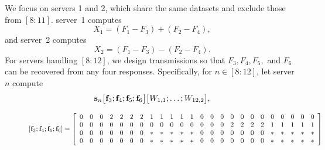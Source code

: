 \documentclass[conference,letterpaper]{IEEEtran}
\begin{document}
\begin{example}

We focus on servers 1 and 2, which share the same datasets and exclude those from $[8{:}11]$. 
server~1 computes 
\[
X_1 = (F_1 - F_3) + (F_2 - F_4),
\]
and server~2 computes
\[
X_2 = (F_1 - F_3) - (F_2 - F_4).
\]
For servers handling $[8{:}12]$, we design transmissions so that $F_3, F_4, F_5,$ and $F_6$ 
can be recovered from any four responses. Specifically, for $n \in [8{:}12]$, let 
server~$n$ compute
\[
{\bf s}_n \bigl[ {\bf f}_3 ; {\bf f}_4 ; {\bf f}_5 ; {\bf f}_6 \bigr] 
\bigl[ W_{1,1}; \ldots; W_{12,2} \bigr],
\]


\iffalse
\begin{figure}
\begin{equation} \label{eq:scheme 3 transmission of second class}
\begin{aligned}
\left[ {{\bf f}}_3 ;  {{\bf f}}_4 ;  {{\bf f}}_5 ;  {{\bf f}}_6 \right] = 
 \left[
\begin{array}{cccccccccccccccccccccccc}
 0 & 0 & 0 &  2 & 2 & 2 & 2 &  1 & 1 & 1 & 1 & 1 & 0 & 0 & 0 & 0 & 0 & 0 & 0 & 0 & 0 & 0 & 0 & 0 \\
 0 & 0 & 0 & 0 & 0 & 0 & 0 & 0 & 0 & 0 & 0 & 0 & 0 & 0 & 0 & 2 & 2 & 2 & 2 & 1 & 1 & 1 & 1 & 1 \\
 0 & 0 & 0 & 0 & 0 & 0 & 0 & * & * & * & * & * & 0 & 0 & 0 & 0 & 0 & 0 & 0 & * & * & * & * & * \\
 0 & 0 & 0 & 0 & 0 & 0 & 0 & * & * & * & * & * & 0 & 0 & 0 & 0 & 0 & 0 & 0 & * & * & * & * & *
\end{array}
 \right]
\end{aligned}
\end{equation}
\end{figure}


\end{example}
\end{document}
